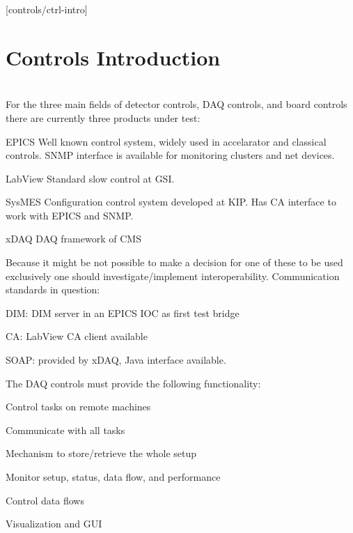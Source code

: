 [controls/ctrl-intro]
\section{Controls Introduction}
\\
For the three main fields of detector controls, DAQ controls, and
board controls there are currently three products under test:
\begin{compactdesc}
\item[EPICS] Well known control system, widely used in accelarator
and classical controls. SNMP interface is available for monitoring
clusters and net devices. \item[LabView] Standard slow control at
GSI. \item[SysMES] Configuration control system developed at KIP.
Has CA interface to work with EPICS and SNMP. \item[xDAQ] DAQ
framework of CMS
\end{compactdesc}
Because it might be not possible to make a decision for one of
these to be used exclusively one should investigate/implement
interoperability. Communication standards in question:
\begin{compactitem}
\item DIM: DIM server in an EPICS IOC as first test bridge 
\item CA: LabView CA client available 
\item SOAP: provided by xDAQ, Java interface available.
\end{compactitem}
The DAQ controls must provide the following functionality:
\begin{compactitem}
\item Control tasks on remote machines
\item Communicate with all tasks
\item Mechanism to store/retrieve the whole setup
\item Monitor setup, status, data flow, and performance
\item Control data flows
\item Visualization and GUI
\end{compactitem}

